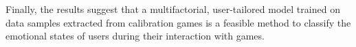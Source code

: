 Finally, the results suggest that a multifactorial, user-tailored model trained on data samples extracted from calibration games is a feasible method to classify the emotional states of users during their interaction with games.




